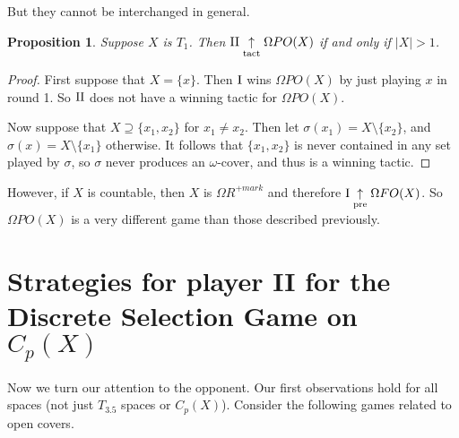 \documentclass{amsart}
\theoremstyle{plain}
\newtheorem{proposition}[theorem]{Proposition}
\theoremstyle{definition}
\theoremstyle{remark}
\theoremstyle{plain}
\theoremstyle{definition}
\theoremstyle{remark}
\begin{document}
But they cannot be interchanged in general.
\begin{proposition}
  Suppose \(X\) is \(T_1\).
  Then \(\mathrm{II}\underset{\text{tact}}{\uparrow}\Omega PO(X)\) if and only if \(|X| > 1\).
\end{proposition}
\begin{proof}
  First suppose that \(X=\{x\}\).
  Then \(\mathrm{I}\) wins \(\Omega PO(X)\) by just playing \(x\) in round 1.
  So \(\mathrm{II}\) does not have a winning tactic for \(\Omega PO(X)\).
  
  Now suppose that \(X\supseteq\{x_1,x_2\}\) for \(x_1\not=x_2\).
  Then let \(\sigma(x_1)=X\setminus\{x_2\}\), and \(\sigma(x)=X\setminus\{x_1\}\)
  otherwise. It follows that \(\{x_1,x_2\}\) is never contained in any
  set played by \(\sigma\), so \(\sigma\) never produces an \(\omega\)-cover,
  and thus is a winning tactic.
\end{proof}

However, if \(X\) is countable, then \(X\) is \(\Omega R^{+mark}\) and therefore \(\mathrm{I}\underset{\text{pre}}{\uparrow} \Omega FO(X)\). 
So \(\Omega PO(X)\) is a very different game than those described previously.

\section{Strategies for player II for the Discrete Selection Game on \(C_p(X)\)}

Now we turn our attention to the opponent.
Our first observations hold for all spaces (not just \(T_{3.5}\) spaces or \(C_p(X)\)).
Consider the following games related to open covers.
\end{document}
